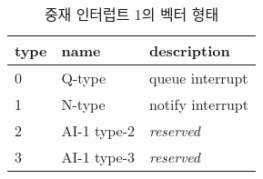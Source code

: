 %
%
\begin{table}[htbp]
\caption{중재 인터럽트 1의 벡터 형태}\label{table:arb-int-vec}
   \begin{center}
   \begin{tabular}{|l|l|l|} \hline
	type & name & description \\
\hline \hline
	0 & Q-type & queue interrupt \\
	1 & N-type & notify interrupt \\
	2 & AI-1 type-2 & {\it reserved} \\
	3 & AI-1 type-3 & {\it reserved} \\
\hline
   \end{tabular}
   \end{center}
\end{table}
%
%
